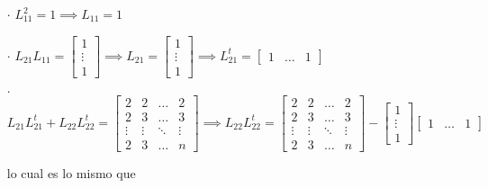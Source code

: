 \begin{itemize}
    \begin{itemize}
        \item[$\cdot$] $L_{11}^{2} = 1 \implies L_{11} = 1$
        \item[$\cdot$] $L_{21}L_{11} = \begin{bmatrix} 1 \\ \vdots \\ 1 \end{bmatrix} \implies 
        L_{21}= \begin{bmatrix} 1 \\ \vdots \\ 1 \end{bmatrix} \implies L_{21}^{t} = \begin{bmatrix} 1 & \ldots & 1 \end{bmatrix}$
        \item[$\cdot$] $L_{21}L_{21}^{t} + L_{22}L_{22}^{t} = 
        \begin{bmatrix} 
            2 & 2 &\ldots & 2 \\
            2 & 3 &\ldots & 3 \\
            \vdots & \vdots & \ddots & \vdots \\
            2 & 3 & \ldots & n
        \end{bmatrix}
        \implies L_{22}L_{22}^{t} = 
        \begin{bmatrix} 
            2 & 2 &\ldots & 2 \\
            2 & 3 &\ldots & 3 \\
            \vdots & \vdots & \ddots & \vdots \\
            2 & 3 & \ldots & n
        \end{bmatrix}
        -
        \begin{bmatrix} 
            1 \\
            \vdots \\
            1 
        \end{bmatrix}
        \begin{bmatrix} 
            1 & \ldots & 1
        \end{bmatrix}
        $

        lo cual es lo mismo que


\end{itemize}
\end{itemize}
